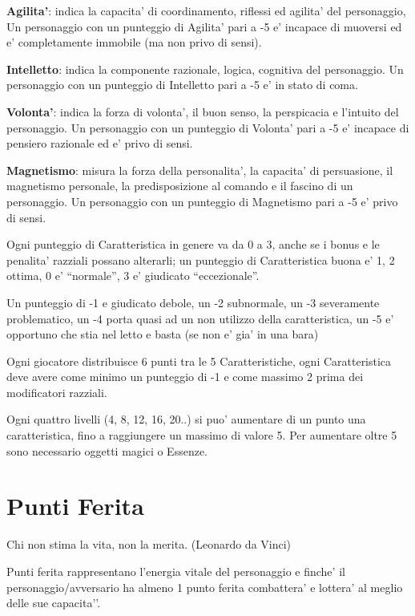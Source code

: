 \documentclass[a4paper,11pt,twoside,openany]{dndbook}
\begin{document}
\textbf{Agilita'}: indica la capacita' di coordinamento, riflessi ed agilita' del personaggio, Un personaggio con un punteggio di Agilita' pari a -5 e' incapace di muoversi ed e' completamente immobile (ma non privo di sensi).

\textbf{Intelletto}: indica la componente razionale, logica, cognitiva del personaggio. Un personaggio con un punteggio di Intelletto pari a -5 e' in stato di coma.

\textbf{Volonta'}: indica la forza di volonta', il buon senso, la perspicacia e l'intuito del personaggio. Un personaggio con un punteggio di Volonta' pari a -5 e' incapace di pensiero razionale ed e' privo di sensi.

\textbf{Magnetismo}: misura la forza della personalita', la capacita' di persuasione, il magnetismo personale, la predisposizione al comando e il fascino di un personaggio. Un personaggio con un punteggio di Magnetismo pari a -5 e' privo di sensi.

\smallskip

Ogni punteggio di Caratteristica in genere va da 0 a 3, anche se i bonus e le penalita' razziali possano alterarli; un punteggio di Caratteristica buona e' 1, 2 ottima, 0 e' ``normale'', 3 e' giudicato ``eccezionale''.

Un punteggio di -1 e giudicato debole, un -2 subnormale, un -3 severamente problematico, un -4 porta quasi ad un non utilizzo della caratteristica, un -5 e' opportuno che stia nel letto e basta (se non e' gia' in una bara)

Ogni giocatore distribuisce 6 punti tra le 5 Caratteristiche, ogni Caratteristica deve avere come minimo un punteggio di -1 e come massimo 2 prima dei modificatori razziali.

Ogni quattro livelli (4, 8, 12, 16, 20..) si puo' aumentare di un punto una caratteristica, fino a raggiungere un massimo di valore 5. Per aumentare oltre 5 sono necessario oggetti magici o Essenze.


\section{Punti Ferita}

\begin{quotebox}Chi non stima la vita, non la merita. (Leonardo da Vinci)
\end{quotebox}


Punti ferita rappresentano l’energia vitale del personaggio e finche’ il personaggio/avversario ha almeno 1 punto ferita combattera’ e lottera’ al meglio delle sue capacita'’.
\end{document}
